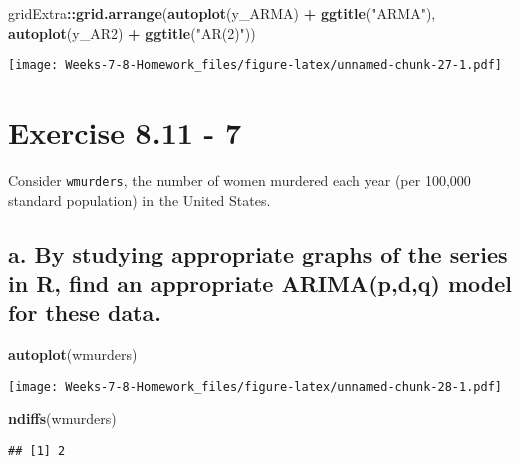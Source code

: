 \documentclass[]{article}
\newenvironment{Shaded}{\begin{snugshade}}{\end{snugshade}}
\newcommand{\KeywordTok}[1]{\textcolor[rgb]{0.13,0.29,0.53}{\textbf{#1}}}
\newcommand{\NormalTok}[1]{#1}
\newcommand{\OperatorTok}[1]{\textcolor[rgb]{0.81,0.36,0.00}{\textbf{#1}}}
\newcommand{\StringTok}[1]{\textcolor[rgb]{0.31,0.60,0.02}{#1}}
\begin{document}
\begin{Shaded}
\begin{Highlighting}[]
\NormalTok{gridExtra}\OperatorTok{::}\KeywordTok{grid.arrange}\NormalTok{(}\KeywordTok{autoplot}\NormalTok{(y_ARMA) }\OperatorTok{+}\StringTok{ }\KeywordTok{ggtitle}\NormalTok{(}\StringTok{"ARMA"}\NormalTok{), }\KeywordTok{autoplot}\NormalTok{(y_AR2) }\OperatorTok{+}\StringTok{ }\KeywordTok{ggtitle}\NormalTok{(}\StringTok{"AR(2)"}\NormalTok{))}
\end{Highlighting}
\end{Shaded}

\texttt{[image: Weeks-7-8-Homework\_files/figure-latex/unnamed-chunk-27-1.pdf]}

\newpage

\hypertarget{exercise-8.11---7}{%
\section{Exercise 8.11 - 7}\label{exercise-8.11---7}}

Consider \texttt{wmurders}, the number of women murdered each year (per
100,000 standard population) in the United States.

\hypertarget{a.-by-studying-appropriate-graphs-of-the-series-in-r-find-an-appropriate-arimapdq-model-for-these-data.}{%
\subsection{a. By studying appropriate graphs of the series in R, find
an appropriate ARIMA(p,d,q) model for these
data.}\label{a.-by-studying-appropriate-graphs-of-the-series-in-r-find-an-appropriate-arimapdq-model-for-these-data.}}

\begin{Shaded}
\begin{Highlighting}[]
\KeywordTok{autoplot}\NormalTok{(wmurders)}
\end{Highlighting}
\end{Shaded}

\texttt{[image: Weeks-7-8-Homework\_files/figure-latex/unnamed-chunk-28-1.pdf]}

\begin{Shaded}
\begin{Highlighting}[]
\KeywordTok{ndiffs}\NormalTok{(wmurders)}
\end{Highlighting}
\end{Shaded}

\begin{verbatim}
## [1] 2
\end{verbatim}
\end{document}

